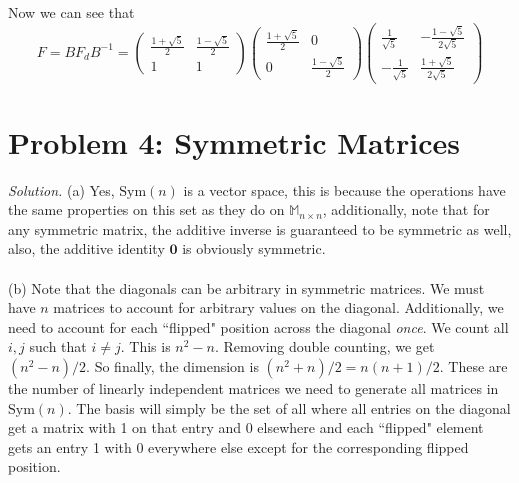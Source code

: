\documentclass{article}
\begin{document}
Now we can see that 
\begin{equation*}
    F = B F_{d} B^{-1} = \begin{pmatrix}
    \frac{1 + \sqrt{5}}{2} & \frac{1 - \sqrt{5}}{2}\\
    1 & 1
    \end{pmatrix} \begin{pmatrix}
        \frac{1 + \sqrt{5}}{2} & 0\\
        0 & \frac{1 - \sqrt{5}}{2}
    \end{pmatrix}\begin{pmatrix}
        \frac{1}{\sqrt{5}} & -\frac{1-\sqrt{5}}{2 \sqrt{5}} \\
-\frac{1}{\sqrt{5}} & \frac{1+\sqrt{5}}{2 \sqrt{5}}\end{pmatrix}
\end{equation*}
\newpage
\section*{Problem 4: Symmetric Matrices}
\emph{Solution. }(a) Yes, $\text{Sym}(n)$ is a vector space, this is because the operations have the same properties on this set as they do on $\mathbb{M}_{n \times n}$, additionally, note that for any symmetric matrix, the additive inverse is guaranteed to be symmetric as well, also, the additive identity $\mathbf{0}$ is obviously symmetric. \\\\
(b) Note that the diagonals can be arbitrary in symmetric matrices. We must have $n$ matrices to account for arbitrary values on the diagonal. Additionally, we need to account for each ``flipped" position across the diagonal \emph{once}. We count all $i, j $ such that $i \neq j$. This is $n^2 - n$. Removing double counting, we get $(n^2 - n)/2$. So finally, the dimension is $(n^2 + n)/2 = n(n+1)/2$. These are the number of linearly independent matrices we need to generate all matrices in $\text{Sym}(n)$. The basis will simply be the set of all where all entries on the diagonal get a matrix with 1 on that entry and 0 elsewhere and each ``flipped" element gets an entry 1 with 0 everywhere else except for the corresponding flipped position. \\\\

\end{document}
